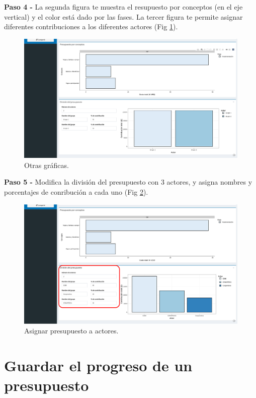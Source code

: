 \documentclass[
]{book}
\begin{document}
\textbf{Paso 4 - } La segunda figura te muestra el resupuesto por conceptos (en el eje vertical) y el color está dado por las fases. La tercer figura te permite asignar diferentes contribuciones a los diferentes actores (Fig \ref{fig:exp-4}).

\begin{figure}
\centering
\includegraphics{images/exp-4.png}
\caption{\label{fig:exp-4}Otras gráficas.}
\end{figure}

\textbf{Paso 5 - } Modifica la división del presupuesto con 3 actores, y asigna nombres y porcentajes de conribución a cada uno (Fig \ref{fig:exp-5}).

\begin{figure}
\centering
\includegraphics{images/exp-5.png}
\caption{\label{fig:exp-5}Asignar presupuesto a actores.}
\end{figure}

\hypertarget{guardar}{%
\chapter{Guardar el progreso de un presupuesto}\label{guardar}}
\end{document}
